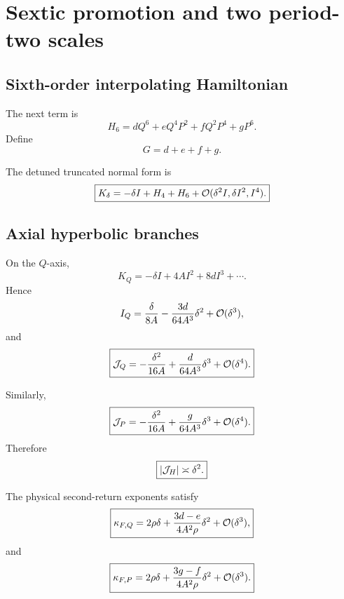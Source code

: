 \section{Sextic promotion and two period-two scales}
\label{sec:sextic}

\subsection{Sixth-order interpolating Hamiltonian}

The next term is
\begin{equation}
\boxed{
H_6
=
dQ^6+eQ^4P^2+fQ^2P^4+gP^6.
}
\label{eq:H6}
\end{equation}
Define
\begin{equation}
\boxed{
G=d+e+f+g.
}
\label{eq:G-def}
\end{equation}

The detuned truncated normal form is
\begin{equation}
\boxed{
K_\delta
=
-\delta I+H_4+H_6
+
\mathcal{O}(\delta^2I,\delta I^2,I^4).
}
\label{eq:K-detuned}
\end{equation}

\subsection{Axial hyperbolic branches}

On the \(Q\)-axis,
\[
K_Q
=
-\delta I+4AI^2+8dI^3+\cdots.
\]
Hence
\[
I_Q
=
\frac{\delta}{8A}
-
\frac{3d}{64A^3}\delta^2
+
\mathcal{O}(\delta^3),
\]
and
\begin{equation}
\boxed{
\mathcal{J}_Q
=
-\frac{\delta^2}{16A}
+
\frac{d}{64A^3}\delta^3
+
\mathcal{O}(\delta^4).
}
\label{eq:JQ}
\end{equation}

Similarly,
\begin{equation}
\boxed{
\mathcal{J}_P
=
-\frac{\delta^2}{16A}
+
\frac{g}{64A^3}\delta^3
+
\mathcal{O}(\delta^4).
}
\label{eq:JP}
\end{equation}
Therefore
\begin{equation}
\boxed{
|\mathcal{J}_H|\asymp\delta^2.
}
\label{eq:axial-action}
\end{equation}

The physical second-return exponents satisfy
\begin{equation}
\boxed{
\kappa_{F,Q}
=
2\rho\delta
+
\frac{3d-e}{4A^2\rho}\delta^2
+
\mathcal{O}(\delta^3),
}
\label{eq:kappaQ}
\end{equation}
and
\begin{equation}
\boxed{
\kappa_{F,P}
=
2\rho\delta
+
\frac{3g-f}{4A^2\rho}\delta^2
+
\mathcal{O}(\delta^3).
}
\label{eq:kappaP}
\end{equation}

